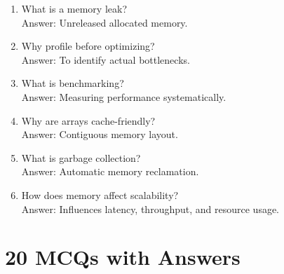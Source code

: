 \begin{enumerate}
\item What is a memory leak?\\
Answer: Unreleased allocated memory.

\item Why profile before optimizing?\\
Answer: To identify actual bottlenecks.

\item What is benchmarking?\\
Answer: Measuring performance systematically.

\item Why are arrays cache-friendly?\\
Answer: Contiguous memory layout.

\item What is garbage collection?\\
Answer: Automatic memory reclamation.

\item How does memory affect scalability?\\
Answer: Influences latency, throughput, and resource usage.
\end{enumerate}

\section{20 MCQs with Answers}

